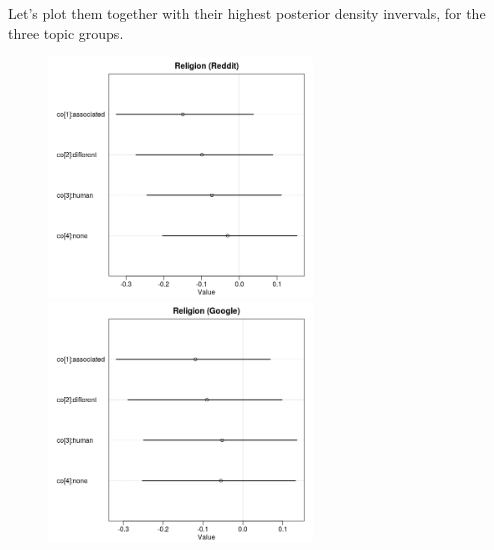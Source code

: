 \documentclass[12pt,]{book}
\begin{document}
\normalsize

\noindent Let's plot them together with their highest posterior density
invervals, for the three topic groups.

\begin{center}
\begin{figure}[!htb]\centering
   \begin{minipage}{0.55\textwidth}
  \includegraphics[width=7cm]{../images/religionCoeffs.jpeg}
   \end{minipage}
   \begin {minipage}{0.43\textwidth}
    \includegraphics[width=7cm]{../images/religionGoogleCoeffs.jpeg}
   \end{minipage}
   

\end{figure}
\end{center}
\end{document}
